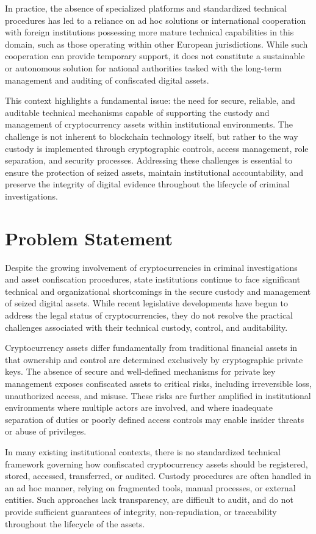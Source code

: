 \documentclass[12pt,a4paper]{report}
\begin{document}
In practice, the absence of specialized platforms and standardized technical procedures has led to a reliance on ad hoc solutions or international cooperation with foreign institutions possessing more mature technical capabilities in this domain, such as those operating within other European jurisdictions. While such cooperation can provide temporary support, it does not constitute a sustainable or autonomous solution for national authorities tasked with the long-term management and auditing of confiscated digital assets.

This context highlights a fundamental issue: the need for secure, reliable, and auditable technical mechanisms capable of supporting the custody and management of cryptocurrency assets within institutional environments. The challenge is not inherent to blockchain technology itself, but rather to the way custody is implemented through cryptographic controls, access management, role separation, and security processes. Addressing these challenges is essential to ensure the protection of seized assets, maintain institutional accountability, and preserve the integrity of digital evidence throughout the lifecycle of criminal investigations.


\section{Problem Statement}
Despite the growing involvement of cryptocurrencies in criminal investigations and asset confiscation procedures, state institutions continue to face significant technical and organizational shortcomings in the secure custody and management of seized digital assets. While recent legislative developments have begun to address the legal status of cryptocurrencies, they do not resolve the practical challenges associated with their technical custody, control, and auditability.

Cryptocurrency assets differ fundamentally from traditional financial assets in that ownership and control are determined exclusively by cryptographic private keys. The absence of secure and well-defined mechanisms for private key management exposes confiscated assets to critical risks, including irreversible loss, unauthorized access, and misuse. These risks are further amplified in institutional environments where multiple actors are involved, and where inadequate separation of duties or poorly defined access controls may enable insider threats or abuse of privileges.

In many existing institutional contexts, there is no standardized technical framework governing how confiscated cryptocurrency assets should be registered, stored, accessed, transferred, or audited. Custody procedures are often handled in an ad hoc manner, relying on fragmented tools, manual processes, or external entities. Such approaches lack transparency, are difficult to audit, and do not provide sufficient guarantees of integrity, non-repudiation, or traceability throughout the lifecycle of the assets.
\end{document}
